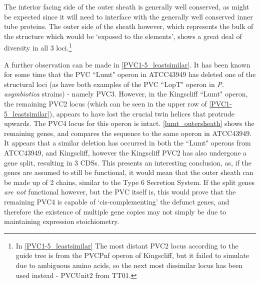 


The interior facing side of the outer sheath is generally well conserved, as might be expected since it will need to interface with the generally well conserved inner tube proteins. The outer side of the sheath however, which represents the bulk of the structure which would be `exposed to the elements', shows a great deal of diversity in all 3 loci.\footnote{In \vref{PVC1-5_leastsimilar} The most distant PVC2 locus according to the guide tree is from the PVCPnf operon of \Pasy{} Kingscliff, but it failed to simulate due to ambiguous amino acids, so the next most dissimilar locus has been used instead - PVCUnit2 from \Plum{} TT01.}

A further observation can be made in \vref{PVC1-5_leastsimilar}. It has been known for some time that the PVC ``Lumt" operon in \Pasy{} ATCC43949 has deleted one of the structural loci (as have both examples of the PVC ``LopT" operon in \emph{P. asymbiotica} strains) - namely PVC3. However, in the Kingscliff ``Lumt" operon, the remaining PVC2 locus (which can be seen in the upper row of \vref{PVC1-5_leastsimilar}), appears to have lost the crucial twin helices that protrude upwards. The PVC4 locus for this operon is intact. \vref{lumt_outersheath} shows the remaining genes, and compares the sequence to the same operon in \Pasy{} ATCC43949. It appears that a similar deletion has occurred in both the ``Lumt" operons from \Pasy{} ATCC43949, and Kingscliff, however the Kingscliff PVC2 has also undergone a gene split, resulting in 3 CDSs. This presents an interesting conclusion, as, if the genes are assumed to still be functional, it would mean that the outer sheath can be made up of 2 chains, similar to the Type 6 Secretion System. If the split genes \emph{are not} functional however, but the PVC itself is, this would prove that the remaining PVC4 is capable of `cis-complementing' the defunct genes, and therefore the existence of multiple gene copies may not simply be due to maintaining expression stoichiometry.


